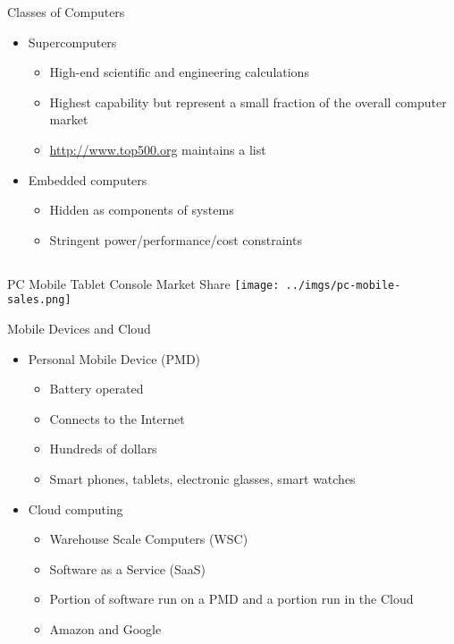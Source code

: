 \documentclass{beamer}
\begin{document}
\begin{frame}{Classes of Computers}
\begin{itemize}
\item Supercomputers
\begin{itemize}
\item High-end scientific and engineering calculations
\item Highest capability but represent a small fraction of the overall computer market 
\item \url{http://www.top500.org} maintains a list
\end{itemize}
\item Embedded computers
\begin{itemize}
\item Hidden as components of systems
\item Stringent power/performance/cost constraints
\end{itemize}
\end{itemize}
\end{frame}

\subsection{}
\begin{frame}{PC Mobile Tablet Console Market Share}
\texttt{[image: ../imgs/pc-mobile-sales.png]}
\end{frame}

\begin{frame}{Mobile Devices and Cloud}
\begin{itemize}
\item Personal Mobile Device (PMD)
\begin{itemize}
\item Battery operated
\item Connects to the Internet
\item Hundreds of dollars
\item Smart phones, tablets, electronic glasses, smart watches
\end{itemize}
\item Cloud computing
\begin{itemize}
\item Warehouse Scale Computers (WSC)
\item Software as a Service (SaaS)
\item Portion of software run on a PMD and a portion run in the Cloud
\item Amazon and Google
\end{itemize}
\end{itemize}
\end{frame}
\end{document}
